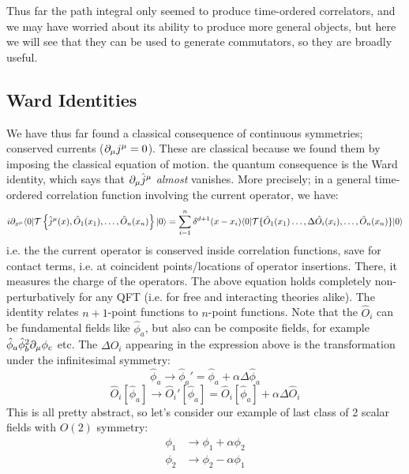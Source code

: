 Thus far the path integral only seemed to produce time-ordered correlators, and we may have worried about its ability to produce more general objects, but here we will see that they can be used to generate commutators, so they are broadly useful. 

\subsection{Ward Identities}
We have thus far found a classical consequence of continuous symmetries; conserved currents ($\partial_\mu j^\mu = 0$). These are classical because we found them by imposing the classical equation of motion. the quantum consequence is the Ward identity, which says that $\partial_\mu \hat{j}^\mu$ \emph{almost} vanishes. More precisely; in a general time-ordered correlation function involving the current operator, we have:
\begin{equation}
    i\partial_{x^\mu}\langle 0 \rvert\mathcal{T}\set{\hat{j}^\mu(x), \hat{O}_1(x_1), \ldots, \hat{O}_n(x_n)}\lvert 0 \rangle = \sum_{i=1}^n \delta^{d+1}(x-x_i)\langle 0 \rvert\mathcal{T}\{\hat{O}_1(x_1) \ldots, \Delta \hat{O}_i(x_i), \ldots, \hat{O}_n(x_n)\}\lvert 0 \rangle
\end{equation}
i.e. the the current operator is conserved inside correlation functions, save for contact terms, i.e. at coincident points/locations of operator insertions. There, it measures the charge of the operators. The above equation holds completely non-perturbatively for any QFT (i.e. for free and interacting theories alike). The identity relates $n+1$-point functions to $n$-point functions. Note that the $\hat{O}_i$ can be fundamental fields like $\hat{\phi}_a$, but also can be composite fields, for example $\hat{\phi}_a\hat{\phi}_b^2 \partial_\mu \phi_c$ etc. The $\Delta \hat{O}_i$ appearing in the expression above is the transformation under the infinitesimal symmetry:
\begin{equation}
    \hat{\phi}_a \to \hat{\phi}_a' = \hat{\phi}_a + \alpha \Delta \hat{\phi}_a
\end{equation}
\begin{equation}
    \hat{O}_i[\hat{\phi}_a] \to \hat{O}_i'[\hat{\phi}_a] = \hat{O}_i[\hat{\phi}_a] + \alpha \Delta \hat{O}_i
\end{equation}
This is all pretty abstract, so let's consider our example of last class of 2 scalar fields with $O(2)$ symmetry:
\begin{subequations}
    \begin{align}
        \phi_1 &\to \phi_1 + \alpha \phi_2
        \\ \phi_2 &\to \phi_2 - \alpha \phi_1
    \end{align}
\end{subequations}
